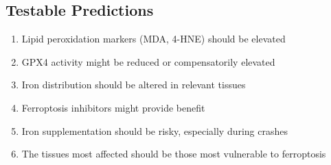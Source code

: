 \subsection{Testable Predictions}

\begin{enumerate}
    \item Lipid peroxidation markers (MDA, 4-HNE) should be elevated
    \item GPX4 activity might be reduced or compensatorily elevated
    \item Iron distribution should be altered in relevant tissues
    \item Ferroptosis inhibitors might provide benefit
    \item Iron supplementation should be risky, especially during crashes
    \item The tissues most affected should be those most vulnerable to ferroptosis
\end{enumerate}



